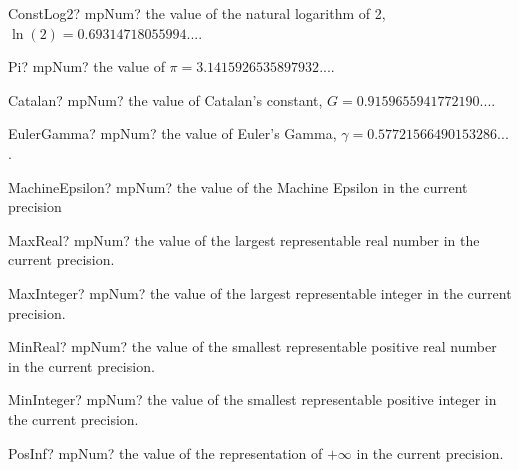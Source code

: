 \documentclass[12pt,a4paper,openany]{book}
\begin{document}
\begin{mpFunctionsExtract}
\mpFunctionZero
{ConstLog2? mpNum? the value of the natural logarithm of 2, $\ln(2) = 0.69314718055994...$.}
\end{mpFunctionsExtract}

\begin{mpFunctionsExtract}
\mpFunctionZero
{Pi? mpNum? the value of $\pi = 3.1415926535897932...$.}
\end{mpFunctionsExtract}

\begin{mpFunctionsExtract}
\mpFunctionZero
{Catalan? mpNum? the value of Catalan's constant, $G = 0.9159655941772190...$.}
\end{mpFunctionsExtract}

\begin{mpFunctionsExtract}
\mpFunctionZero
{EulerGamma? mpNum? the value of Euler's Gamma, $\gamma = 0.57721566490153286...$.}
\end{mpFunctionsExtract}

\begin{mpFunctionsExtract}
\mpFunctionZero
{MachineEpsilon? mpNum? the value of the Machine Epsilon in the current precision}
\end{mpFunctionsExtract}

\begin{mpFunctionsExtract}
\mpFunctionZero
{MaxReal? mpNum? the value of the largest representable real number in the current precision.}
\end{mpFunctionsExtract}

\begin{mpFunctionsExtract}
\mpFunctionZero
{MaxInteger? mpNum? the value of the largest representable integer in the current precision.}
\end{mpFunctionsExtract}

\begin{mpFunctionsExtract}
\mpFunctionZero
{MinReal? mpNum? the value of the smallest representable positive real number in the current precision.}
\end{mpFunctionsExtract}

\begin{mpFunctionsExtract}
\mpFunctionZero
{MinInteger? mpNum? the value of the smallest representable positive integer in the current precision.}
\end{mpFunctionsExtract}

\begin{mpFunctionsExtract}
\mpFunctionZero
{PosInf? mpNum? the value of the representation of  $+\infty$ in the current precision.}
\end{mpFunctionsExtract}
\end{document}
